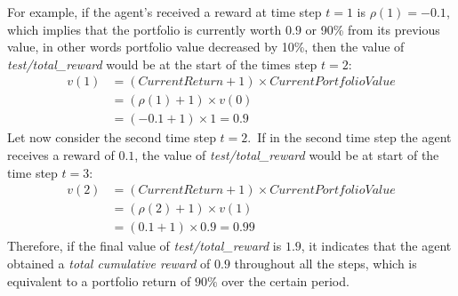 \documentclass[../xlapes02]{subfiles}
\begin{document}
    For example, if the agent's received a reward at time step $t=1$ is $\rho(1)=-0.1$, which implies that the portfolio is currently worth $0.9$ or 90\% from its previous value, in other words portfolio value decreased by 10\%, then the value of \emph{test/total\_reward} would be at the start of the times step $t=2$:
    \begin{equation}
        \label{eq:portfolio-value-example}
        \begin{split}
            v(1) &= (CurrentReturn+1)\times CurrentPortfolioValue  \\
            &= (\rho(1)+1)\times v(0) \\
            &= (-0.1+1)\times 1 = 0.9
        \end{split}
    \end{equation}
    Let now consider the second time step $t=2$.\ If in the second time step the agent receives a reward of $0.1$, the value of \emph{test/total\_reward} would be at start of the time step $t=3$:
    \begin{equation}
        \begin{split}
            v(2) &= (CurrentReturn+1)\times CurrentPortfolioValue  \\
            &= (\rho(2)+1)\times v(1) \\
            &= (0.1+1) \times 0.9 = 0.99
        \end{split}
    \end{equation}
    Therefore, if the final value of \emph{test/total\_reward} is $1.9$, it indicates that the agent obtained a \emph{total cumulative reward} of $0.9$ throughout all the steps, which is equivalent to a portfolio return of $90\%$ over the certain period.
\end{document}
